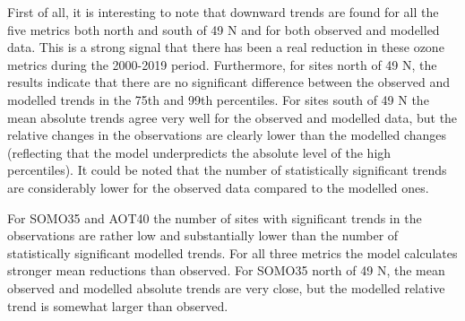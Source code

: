 First of all, it is interesting to note that downward trends are found for all the five metrics both north and south of 49 \degrees N and for both observed and modelled data. This is a strong signal that there has been a real reduction in these ozone metrics during the 2000-2019 period. Furthermore, for sites north of 49 \degrees N, the results indicate that there are no significant difference between the observed and modelled trends in the 75th and 99th percentiles. For sites south of 49 \degrees N the mean absolute trends agree very well for the observed and modelled data, but the relative changes in the observations are clearly lower than the modelled changes (reflecting that the model underpredicts the absolute level of the high percentiles). It could be noted that the number of statistically significant trends are considerably lower for the observed data compared to the modelled ones. 

For SOMO35 and AOT40 the number of sites with significant trends in the observations are rather low and substantially lower than the number of statistically significant modelled trends. For all three metrics the model calculates stronger mean reductions than observed. For SOMO35 north of 49 \degrees N, the mean observed and modelled absolute trends are very close, but the modelled relative trend is somewhat larger than observed.




